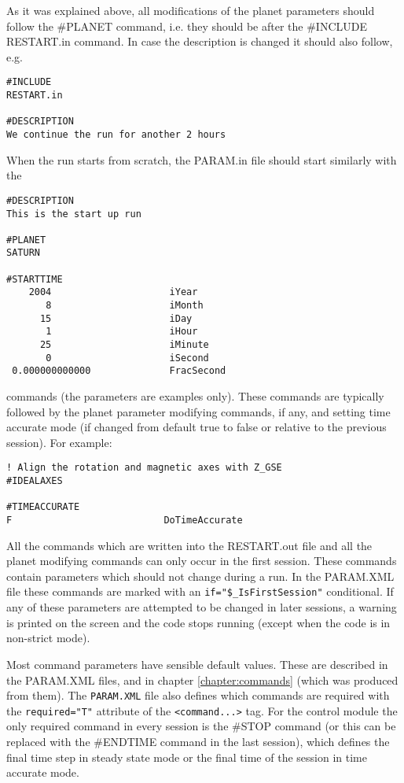 As it was explained above, all modifications of the planet 
parameters should follow the \#PLANET command, i.e. they should be after 
the \#INCLUDE RESTART.in command. In case the description is
changed it should also follow, e.g.
\begin{verbatim}
#INCLUDE
RESTART.in

#DESCRIPTION
We continue the run for another 2 hours
\end{verbatim}
When the run starts from scratch, the PARAM.in file
should start similarly with the 
\begin{verbatim}
#DESCRIPTION
This is the start up run

#PLANET
SATURN

#STARTTIME
    2004                     iYear
       8                     iMonth
      15                     iDay
       1                     iHour
      25                     iMinute
       0                     iSecond
 0.000000000000              FracSecond
\end{verbatim}
commands (the parameters are examples only).
These commands are typically followed by the planet parameter
modifying commands, if any, and setting time accurate mode
(if changed from default true to false or relative to the previous session).
For example:
\begin{verbatim}
! Align the rotation and magnetic axes with Z_GSE
#IDEALAXES

#TIMEACCURATE
F                           DoTimeAccurate
\end{verbatim}
All the commands which are written into the RESTART.out file and all 
the planet modifying commands can only occur in the first session.
These commands contain parameters which should not change during a run.
In the PARAM.XML file these commands are marked with an 
{\tt if="\$\_IsFirstSession"} conditional.
If any of these parameters are attempted to be changed in later sessions, 
a warning is printed on the screen and the code stops running
(except when the code is in non-strict mode).

Most command parameters have sensible default values.
These are described in the PARAM.XML files,
and in chapter \ref{chapter:commands} (which was produced from them).
The {\tt PARAM.XML} file also defines which commands are required
with the {\tt required="T"} attribute of the {\tt <command...>} tag.
For the control module the only required command in every
session is the \#STOP command
(or this can be replaced with the \#ENDTIME command in the last session), 
which defines the final time step in steady state mode 
or the final time of the session in time accurate mode.

